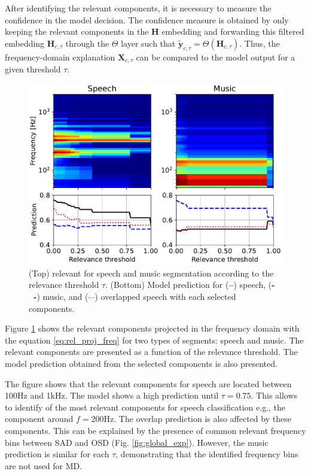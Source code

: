 After identifying the relevant components, it is necessary to measure the confidence in the model decision.
The confidence measure is obtained by only keeping the relevant components in the $\mathbf{H}$ embedding and forwarding this filtered embedding $\mathbf{H}_{c,\tau}$ through the $\Theta$ layer such that $\tilde{\mathbf{y}}_{c,\tau}=\Theta(\mathbf{H}_{c,\tau})$.
Thus, the frequency-domain explanation $\mathbf{X}_{c,\tau}$ can be compared to the model output for a given threshold $\tau$.

\begin{figure}[ht]
    \centering
    \includegraphics[width=\linewidth]{figs/icassp_rkc.pdf}
    \caption{(Top) relevant for speech and music segmentation according to the relevance threshold $\tau$. (Bottom) Model prediction for (\textbf{--}) speech, (\textbf{\textcolor{blue}{-~-}}) music, and (\textcolor{red}{$\boldsymbol{\cdots}$}) overlapped speech with each selected components.}
    \label{fig:seg_explain}
\end{figure}

Figure \ref{fig:seg_explain} shows the relevant components projected in the frequency domain with the equation \eqref{eq:rel_proj_freq} for two types of segments: speech and music.
The relevant components are presented as a function of the relevance threshold.
The model prediction obtained from the selected components is also presented.

The figure shows that the relevant components for speech are located between 100Hz and 1kHz. 
The model shows a high prediction until $\tau=0.75$. 
This allows to identify of the most relevant components for speech classification e.g., the component around $f=$200Hz.
The overlap prediction is also affected by these components.
This can be explained by the presence of common relevant frequency bins between SAD and OSD (Fig. \ref{fig:global_exp}).
However, the music prediction is similar for each $\tau$, demonstrating that the identified frequency bins are not used for MD.

